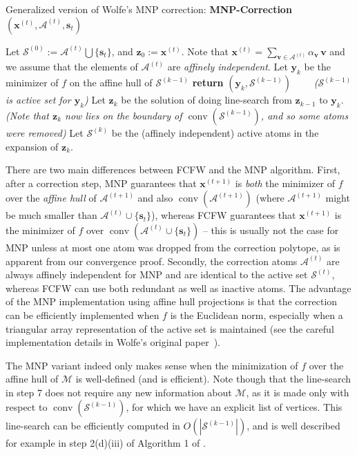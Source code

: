 \documentclass{article} %
\DeclareMathOperator*{\conv}{conv}
\newcommand{\domain}{\mathcal{M}} %
\newcommand{\x}{\bm{x}}
\newcommand{\y}{\bm{y}}
\newcommand{\z}{\bm{z}}
\newcommand{\s}{\bm{s}}
\newcommand{\vv}{\bm{v}} %
\newcommand{\Vertices}{\mathcal{A}} %
\newcommand{\Coreset}{\mathcal{S}}
\renewcommand{\S}{\mathcal{S}}
\newcommand{\0}{\mathbf{0}} %
\begin{document}
\begin{algorithm}
	\caption{Generalized version of Wolfe's MNP correction: \textbf{MNP-Correction}$(\x^{(t)}, \Vertices^{(t)}, \s_t)$} %
	\label{alg:MNP}
	\begin{algorithmic}[1]
	\STATE Let $\S^{(0)} := \Vertices^{(t)} \bigcup \{\s_t\}$, and $\z_0 := \x^{(t)}$. Note that $\x^{(t)} = \sum_{\vv \in \Vertices^{(t)}} \alpha_{\vv} \, \vv$ and we assume that the elements 
	of $\Vertices^{(t)}$ are \emph{affinely independent}.
	\FOR{$k=1\dots |\S^{(0)}|$}
		\STATE Let $\y_k$ be the minimizer of $f$ on the affine hull of $\S^{(k-1)}$
		\IF{$\y_k$ is in the relative interior of $\conv(\S^{(k-1)})$}
			\STATE \textbf{return} $(\y_k, \S^{(k-1)}) \quad\quad$ \emph{($\S^{(k-1)}$ is active set for $\y_k$)} 
		\ELSE
			\STATE Let $\z_k$ be the solution of doing line-search from $\z_{k-1}$ to $\y_k$. {}
			\STATE \emph{\small (Note that $\z_k$ now lies on the boundary of $\conv(\S^{(k-1)})$, and so some atoms were removed)} 
			\STATE Let $\S^{(k)}$ be the (affinely independent) active atoms in the expansion of $\z_k$.
		 \ENDIF	
	\ENDFOR
	\end{algorithmic}
\end{algorithm}


There are two main differences between FCFW and the
MNP algorithm. First, after a correction step, MNP guarantees that $\x^{(t+1)}$ is \emph{both} the minimizer of
$f$ over the \emph{affine hull} of $\Vertices^{(t+1)}$ and also $\conv(\Vertices^{(t+1)})$ (where $\Vertices^{(t+1)}$ might
be much smaller than $\Vertices^{(t)} \cup
\{\s_t\}$), whereas FCFW guarantees that
$\x^{(t+1)}$ is the minimizer of $f$ over $\conv(\Vertices^{(t)} \cup
\{\s_t\})$ -- this is usually not the case for MNP unless at most one atom
was dropped from the correction polytope, as is apparent from our convergence proof. 
Secondly, the correction atoms $\Vertices^{(t)}$ are always
affinely independent for MNP and are identical to the active set
$\Coreset^{(t)}$, whereas FCFW can use both redundant as well as inactive atoms. 
The advantage of the MNP
implementation using affine hull projections is that the correction can be
efficiently implemented when $f$ is the Euclidean norm, especially when a
triangular array representation of the active set is maintained (see the
careful implementation details in Wolfe's original paper~\citep{Wolfe:1976:MNP}).

The MNP variant indeed only makes sense when the minimization of $f$ over the affine hull of $\domain$ is well-defined (and is efficient). Note though that the line-search in step 7 does not require any new information about $\domain$, as it is made only with respect to $\conv(\S^{(k-1)})$, for which we have an explicit list of vertices. This line-search can be efficiently computed in $O(|\S^{(k-1)}|)$, and is well described for example in step 2(d)(iii) of Algorithm 1 of .
\end{document}
